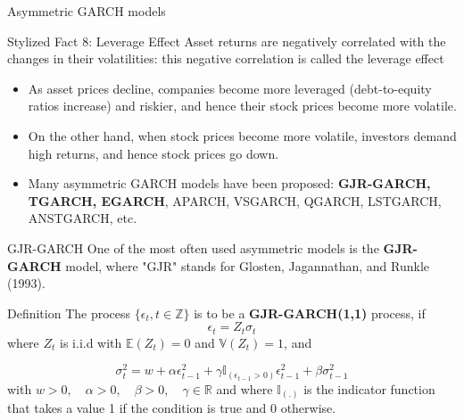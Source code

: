 \documentclass{beamer}
\def\Z{\mathbb{Z}}
\def\R{\mathbb{R}}
\def\Esp{\mathbb{E}}
\def\Var{\mathbb{V}}
\newcommand{\imfbold}[1]{\textbf{\textcolor{imfblue}{#1}}}
\begin{document}
\begin{frame}{Asymmetric GARCH models}
    \begin{block}{Stylized Fact 8: Leverage Effect}
        Asset returns are negatively correlated with the changes in their volatilities: this negative correlation is called the leverage effect
    \end{block}
    \medskip
    \begin{itemize}
        \item As asset prices decline, companies become more leveraged (debt-to-equity ratios increase) and riskier, and hence their stock prices become more volatile.
        \item On the other hand, when stock prices become more volatile, investors demand high returns, and hence stock prices go down.
        \item Many asymmetric GARCH models have been proposed: \textbf{GJR-GARCH, TGARCH, EGARCH}, APARCH, VSGARCH, QGARCH, LSTGARCH, ANSTGARCH, etc.
    \end{itemize}
\end{frame}

\begin{frame}{GJR-GARCH}
    One of the most often used asymmetric models is the \imfbold{GJR-GARCH} model, where "GJR" stands for Glosten, Jagannathan, and Runkle (1993).
    \begin{block}{Definition}
        The process $\{\epsilon_t, t \in \Z\}$ is to be a \textbf{GJR-GARCH(1,1)} process, if
        $$\epsilon_t = Z_t\sigma_t$$
        where $Z_t$ is i.i.d with $\Esp(Z_t) = 0$ and $\Var(Z_t)=1$, and 
        
        $$\sigma_t^2 = w+\alpha\epsilon_{t-1}^2 + \gamma \mathbb{I}_{(\epsilon_{t-1}>0)}\epsilon_{t-1}^2 + \beta \sigma_{t-1}^2$$
        with $w>0, \quad \alpha>0, \quad \beta>0, \quad \gamma \in \R$ and where  $\mathbb{I}_{(.)}$ is the indicator function that takes a value 1 if the condition is true and 0 otherwise.
    \end{block}
\end{frame}
\end{document}
